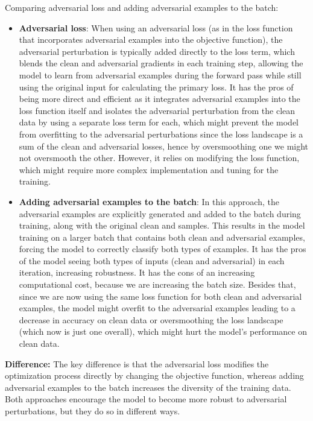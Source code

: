 \documentclass{article}
\begin{document}
Comparing adversarial loss and adding adversarial examples to the batch: 

\begin{itemize}
    \item \textbf{Adversarial loss}: When using an adversarial loss (as in the loss function that incorporates adversarial examples
    into the objective function), the adversarial perturbation is typically added directly to the loss term, which blends
    the clean and adversarial gradients in each training step, allowing the model to learn from adversarial examples
    during the forward pass while still using the original input for calculating the primary loss. It has the pros of
    being more direct and efficient as it integrates adversarial examples into the loss function itself and isolates
    the adversarial perturbation from the clean data by using a separate loss term for each, which might prevent the model
    from overfitting to the adversarial perturbations since the loss landscape is a sum of the clean and adversarial losses, 
    hence by oversmoothing one we might not oversmooth the other.
    However, it relies on modifying the loss function, which might require more complex implementation and tuning for the training. 

    \item \textbf{Adding adversarial examples to the batch}: In this approach, the adversarial examples are explicitly
    generated and added to the batch during training, along with the original clean and samples. This results in the model
    training on a larger batch that contains both clean and adversarial examples, forcing the model to correctly classify
    both types of examples. It has the pros of the model seeing both types of inputs (clean and adversarial) in each
    iteration, increasing robustness. It has the cons of an increasing computational cost, because we are increasing
    the batch size. Besides that, since we are now using the same loss function for both clean and adversarial examples,
    the model might overfit to the adversarial examples leading to a decrease in accuracy on clean data or oversmoothing
    the loss landscape (which now is just one overall), which might hurt the model's performance on clean data.
\end{itemize}

\textbf{Difference:} The key difference is that the adversarial loss modifies the optimization process directly by changing the objective function, whereas adding adversarial examples to the batch increases the diversity of the training data. Both approaches encourage the model to become more robust to adversarial perturbations, but they do so in different ways.
\end{document}
